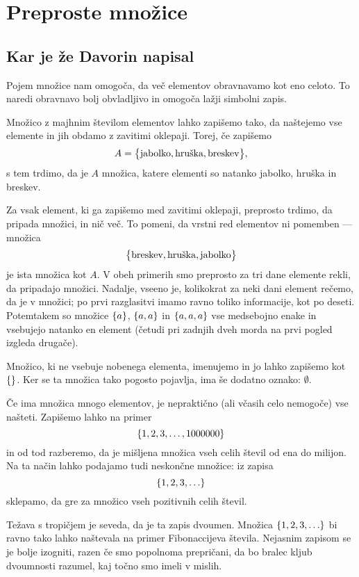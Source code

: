 \chapter{Preproste množice}
\label{cha:preproste-mnozice}



\section{Kar je že Davorin napisal}

Pojem množice nam omogoča, da več elementov obravnavamo kot eno celoto. To naredi obravnavo bolj obvladljivo in omogoča lažji simbolni zapis.

Množico z majhnim številom elementov lahko zapišemo tako, da naštejemo vse elemente in jih obdamo z zavitimi oklepaji. Torej, če zapišemo
\[A = \set[1]{\text{jabolko}, \text{hruška}, \text{breskev}},\]
s tem trdimo, da je $A$ množica, katere elementi so natanko jabolko, hruška in breskev.

Za vsak element, ki ga zapišemo med zavitimi oklepaji, preprosto trdimo, da pripada množici, in nič več. To pomeni, da vrstni red elementov ni pomemben --- množica
\[\set[1]{\text{breskev}, \text{hruška}, \text{jabolko}}\]
je ista množica kot $A$. V obeh primerih smo preprosto za tri dane elemente rekli, da pripadajo množici. Nadalje, vseeno je, kolikokrat za neki dani element rečemo, da je v množici; po prvi razglasitvi imamo ravno toliko informacije, kot po deseti. Potemtakem so množice $\set{a}$, $\set{a, a}$ in $\set{a, a, a}$ vse medsebojno enake in vsebujejo natanko en element (četudi pri zadnjih dveh morda na prvi pogled izgleda drugače).

Množico, ki ne vsebuje nobenega elementa, imenujemo  in jo lahko zapišemo kot $\set{}$. Ker se ta množica tako pogosto pojavlja, ima še dodatno oznako: $\emptyset$.

Če ima množica mnogo elementov, je nepraktično (ali včasih celo nemogoče) vse našteti. Zapišemo lahko na primer
\[\set{1, 2, 3, \ldots, 1000000}\]
in od tod razberemo, da je mišljena množica vseh celih števil od ena do milijon. Na ta način lahko podajamo tudi neskončne množice: iz zapisa
\[\set{1, 2, 3, \ldots}\]
sklepamo, da gre za množico vseh pozitivnih celih števil.

Težava s tropičjem je seveda, da je ta zapis dvoumen. Množica $\set{1, 2, 3, \ldots}$ bi ravno tako lahko naštevala na primer Fibonaccijeva števila. Nejasnim zapisom se je bolje izogniti, razen če smo popolnoma prepričani, da bo bralec kljub dvoumnosti razumel, kaj točno smo imeli v mislih.

